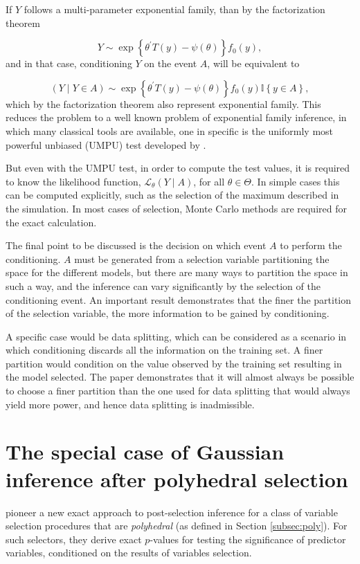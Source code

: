 \documentclass{article}
\begin{document}
If $Y$ follows a multi-parameter exponential family, than by the
factorization theorem

\[
Y\sim\exp\left\{ \theta^{'}T\left(y\right)-\psi\left(\theta\right)\right\}
f_{0}\left(y\right),
\]
and in that case, conditioning $Y$ on the event $A$, will be equivalent
to

\[
\left(Y\mid Y\in A\right)\sim\exp\left\{
\theta^{'}T\left(y\right)-\psi\left(\theta\right)\right\}
f_{0}\left(y\right)\mathbb{I}\left\{ y\in A\right\} ,
\]
which by the factorization theorem also represent exponential family.
This reduces the problem to a well known problem of exponential family
inference, in which many classical tools are available, one in specific
is the uniformly most powerful unbiased (UMPU) test developed by
\cite{lehmann55estimation}. 

But even with the UMPU test, in order to compute the test values,
it is required to know the likelihood function,
$\mathcal{L}_{\theta}\left(Y\mid A\right)$,
for all $\theta\in\Theta$. In simple cases this can be computed explicitly,
such as the selection of the maximum described in the simulation.
In most cases of selection, Monte Carlo methods are required for the
exact calculation.

The final point to be discussed is the decision on which event $A$
to perform the conditioning. $A$ must be generated from a selection variable 
partitioning the space for the different models, but there are many ways to 
partition the space in such a way, and the inference can vary significantly by
the selection of the conditioning event. An important result demonstrates that 
the finer the partition of the selection variable, the more information to be 
gained by conditioning.

A specific case would be data splitting, which can be considered as a scenario
in which conditioning discards all the information on the training set. A finer
partition would condition on the value observed by the training set resulting
in the model selected. The paper demonstrates that it will almost always be
possible to choose a finer partition than the one used for data splitting that
would always yield more power, and hence data splitting is inadmissible. 

\section{The special case of Gaussian inference after polyhedral selection}
\label{sec:taylor}
\citet{taylor14post} pioneer a new exact approach to post-selection inference
for a class of variable selection procedures that are \emph{polyhedral} (as
defined in Section \ref{subsec:poly}). For such selectors, they derive
exact $p$-values for testing the significance of predictor variables,
conditioned on the results of variables selection.
\end{document}
